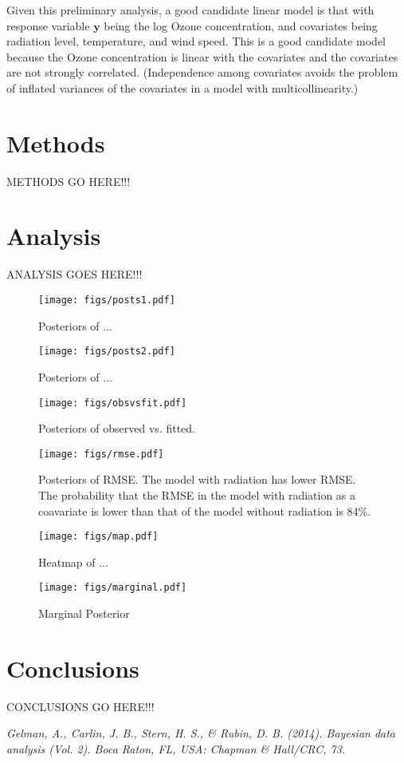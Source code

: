 \documentclass{../../tex_template/asaproc}
\newcommand{\y}{\bm y}
\begin{document}
Given this preliminary analysis, a good candidate linear model is that with
response variable $\y$ being the log Ozone concentration, and covariates being
radiation level, temperature, and wind speed. This is a good candidate model
because the Ozone concentration is linear with the covariates and the 
covariates are not strongly correlated. (Independence among covariates avoids
the problem of inflated variances of the covariates in a model with
multicollinearity.)

\section{Methods}
METHODS GO HERE!!!

\section{Analysis}
ANALYSIS GOES HERE!!!
\begin{figure}[H]
  \texttt{[image: figs/posts1.pdf]}
  \caption{\small Posteriors of ... }
  \label{fig:posts1}
\end{figure}

\begin{figure}[H]
  \texttt{[image: figs/posts2.pdf]}
  \caption{\small Posteriors of ... }
  \label{fig:posts2}
\end{figure}

\begin{figure}[H]
  \texttt{[image: figs/obsvsfit.pdf]}
  \caption{\small Posteriors of observed vs. fitted. }
  \label{fig:obsvsfit}
\end{figure}

\begin{figure}[H]
  \texttt{[image: figs/rmse.pdf]}
  \caption{\small Posteriors of RMSE. The model with radiation has lower RMSE. The probability that the RMSE in the
   model with radiation as a coavariate is lower than that of the model without radiation is 84\%.}
  \label{fig:rmse}
\end{figure}

\begin{figure}[H]
  \texttt{[image: figs/map.pdf]}
  \caption{\small Heatmap of ...}
  \label{fig:map}
\end{figure}

\begin{figure}[H]
  \texttt{[image: figs/marginal.pdf]}
  \caption{\small Marginal Posterior}
  \label{fig:marginal}
\end{figure}

\section{Conclusions}
CONCLUSIONS GO HERE!!!

\begin{references}
{\footnotesize
\itemsep=3pt
\item {\em Gelman, A., Carlin, J. B., Stern, H. S., \& Rubin, D. B. (2014). Bayesian data analysis (Vol. 2). Boca Raton, FL, USA: Chapman \& Hall/CRC, 73.}
}

\end{references}
\end{document}
